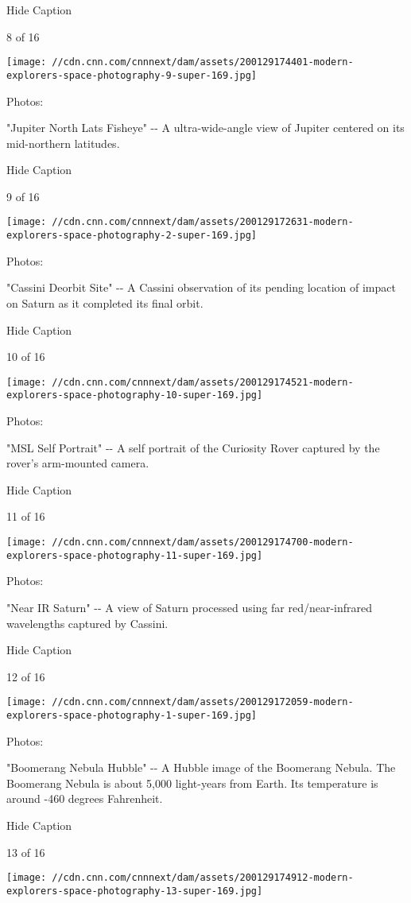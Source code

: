 Hide Caption

8 of 16

\texttt{[image: //cdn.cnn.com/cnnnext/dam/assets/200129174401-modern-explorers-space-photography-9-super-169.jpg]}

Photos:

"Jupiter North Lats Fisheye" -\/- A ultra-wide-angle view of Jupiter
centered on its mid-northern latitudes.

Hide Caption

9 of 16

\texttt{[image: //cdn.cnn.com/cnnnext/dam/assets/200129172631-modern-explorers-space-photography-2-super-169.jpg]}

Photos:

"Cassini Deorbit Site" -\/- A Cassini observation of its pending
location of impact on Saturn as it completed its final orbit.

Hide Caption

10 of 16

\texttt{[image: //cdn.cnn.com/cnnnext/dam/assets/200129174521-modern-explorers-space-photography-10-super-169.jpg]}

Photos:

"MSL Self Portrait" -\/- A self portrait of the Curiosity Rover captured
by the rover's arm-mounted camera.

Hide Caption

11 of 16

\texttt{[image: //cdn.cnn.com/cnnnext/dam/assets/200129174700-modern-explorers-space-photography-11-super-169.jpg]}

Photos:

"Near IR Saturn" -\/- A view of Saturn processed using far
red/near-infrared wavelengths captured by Cassini.

Hide Caption

12 of 16

\texttt{[image: //cdn.cnn.com/cnnnext/dam/assets/200129172059-modern-explorers-space-photography-1-super-169.jpg]}

Photos:

"Boomerang Nebula Hubble" -\/- A Hubble image of the Boomerang Nebula.
The Boomerang Nebula is about 5,000 light-years from Earth. Its
temperature is around -460 degrees Fahrenheit.

Hide Caption

13 of 16

\texttt{[image: //cdn.cnn.com/cnnnext/dam/assets/200129174912-modern-explorers-space-photography-13-super-169.jpg]}

